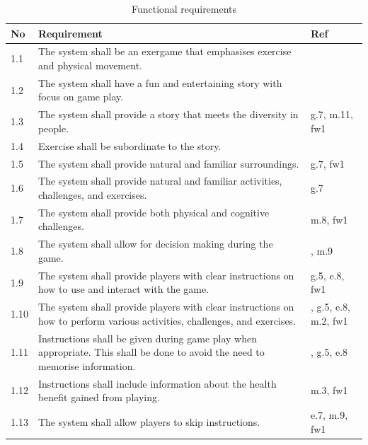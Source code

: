 \begin{table} [H]
\centering
\begin{tabular}{|>{\raggedright}p{}|p{}|p{}|}
\hline
\textbf{No} & \textbf{Requirement} &  \textbf{Ref}\\ \hline
1.1 & The system shall be an exergame that emphasises exercise and physical movement. & \cite{project} \\ \hline
1.2 & The system shall have a fun and entertaining story with focus on game play.  & \cite{project} \cite{zyda2005visual} \\ \hline
1.3 & The system shall provide a story that meets the diversity in people. & g.7, m.11, fw1 \\ \hline
1.4 & Exercise shall be subordinate to the story.  & \cite{zyda2005visual} \\ \hline
1.5 & The system shall provide natural and familiar surroundings.  & g.7, fw1\\ \hline
1.6 & The system shall provide natural and familiar activities, challenges, and exercises. & g.7 \\ \hline
1.7 & The system shall provide both physical and cognitive challenges. & m.8, fw1 \\ \hline
1.8 & The system shall allow for decision making during the game. & \cite{understandingvg}, m.9 \\ \hline
1.9 & The system shall provide players with clear instructions on how to use and interact with the game. & g.5, e.8, fw1 \\ \hline
1.10 & The system shall provide players with clear instructions on how to perform various activities, challenges, and exercises. & \cite{sweetser}, g.5, e.8, m.2, fw1\\ \hline
1.11 & Instructions shall be given during game play when appropriate. This shall be done to avoid the need to memorise information. & \cite{sweetser}, g.5, e.8 \\ \hline
1.12 & Instructions shall include information about the health benefit gained from playing. & m.3, fw1\\ \hline
1.13 & The system shall allow players to skip instructions. & \cite{sweetser} e.7, m.9, fw1 \\ \hline 

    \end{tabular}
    \caption[Functional requirements, part 1]{Functional requirements}
    \label{tab:func1}
\end{table} 

